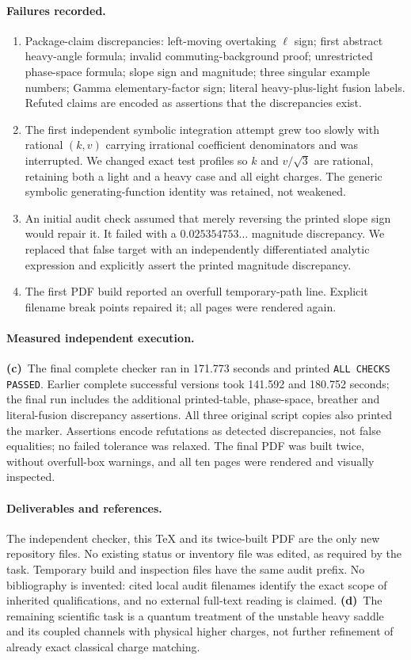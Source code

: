 \documentclass[11pt,a4paper]{article}
\newcommand{\Lc}{\textbf{(c)}\ }
\newcommand{\Ld}{\textbf{(d)}\ }
\begin{document}
\paragraph{Failures recorded.}
\begin{enumerate}
\item Package-claim discrepancies: left-moving overtaking $\ell$ sign;
first abstract heavy-angle formula; invalid commuting-background proof;
unrestricted phase-space formula; slope sign and magnitude; three singular
example numbers; Gamma elementary-factor sign; literal heavy-plus-light fusion labels. Refuted claims are encoded as
assertions that the discrepancies exist.
\item The first independent symbolic integration attempt grew too slowly
with rational $(k,v)$ carrying irrational coefficient denominators and was
interrupted. We changed exact test profiles so $k$ and $v/\sqrt3$ are rational,
retaining both a light and a heavy case and all eight charges. The generic
symbolic generating-function identity was retained, not weakened.
\item An initial audit check assumed that merely reversing the printed
slope sign would repair it. It failed with a $0.025354753\ldots$ magnitude
discrepancy. We replaced that false target with an independently differentiated
analytic expression and explicitly assert the printed magnitude discrepancy.
\item The first PDF build reported an overfull temporary-path line.
Explicit filename break points repaired it; all pages were rendered again.
\end{enumerate}

\paragraph{Measured independent execution.}
\Lc The final complete checker ran in 171.773 seconds and printed
\texttt{ALL CHECKS PASSED}. Earlier complete successful versions took
141.592 and 180.752 seconds; the final run includes the additional printed-table,
phase-space, breather and literal-fusion discrepancy assertions. All three
original script copies also printed the marker. Assertions encode refutations
as detected discrepancies, not false equalities; no failed tolerance was relaxed.
The final PDF was built twice, without overfull-box warnings, and all ten pages
were rendered and visually inspected.

\paragraph{Deliverables and references.}
The independent checker, this TeX and its twice-built PDF are the only new
repository files. No existing status or inventory file was edited, as required
by the task. Temporary build and inspection files have the same audit prefix.
No bibliography is invented: cited local audit filenames identify the exact
scope of inherited qualifications, and no external full-text reading is
claimed. \Ld The remaining scientific task is a quantum treatment of the
unstable heavy saddle and its coupled channels with physical higher charges,
not further refinement of already exact classical charge matching.
\end{document}

